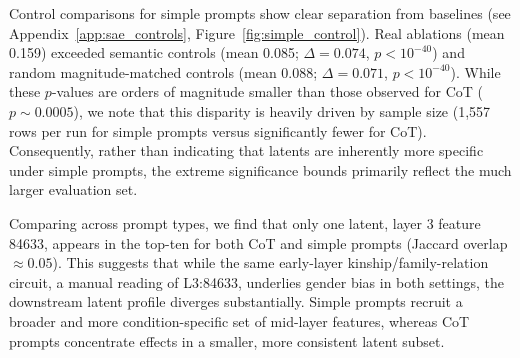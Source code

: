 \documentclass{article}
\begin{document}


{Control comparisons for simple prompts show clear separation from baselines (see Appendix~\ref{app:sae_controls}, Figure~\ref{fig:simple_control}). Real ablations (mean 0.159) exceeded semantic controls (mean 0.085; $\Delta = 0.074$, $p < 10^{-40}$) and random magnitude-matched controls (mean 0.088; $\Delta = 0.071$, $p < 10^{-40}$). While these $p$-values are orders of magnitude smaller than those observed for CoT ($p \sim 0.0005$), we note that this disparity is heavily driven by sample size (1,557 rows per run for simple prompts versus significantly fewer for CoT). Consequently, rather than indicating that latents are inherently more specific under simple prompts, the extreme significance bounds primarily reflect the much larger evaluation set.}




Comparing across prompt types, we find that only one latent, layer 3 feature 84633, appears in the top-ten for both CoT and simple prompts (Jaccard overlap $\approx 0.05$). This suggests that while the same early-layer kinship/family-relation circuit, a manual reading of L3:84633, underlies gender bias in both settings, the downstream latent profile diverges substantially. Simple prompts recruit a broader and more condition-specific set of mid-layer features, whereas CoT prompts concentrate effects in a smaller, more consistent latent subset.
\end{document}
